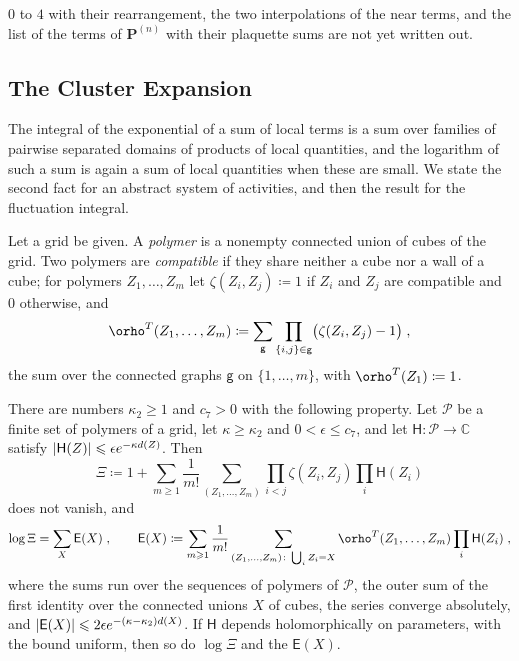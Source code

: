 \documentclass[11pt]{preprint}
\let\rho\orho
\DeclarePairedDelimiter{\abs}{\lvert}{\rvert}
\numberwithin{equation}{section}
\begin{document}
$0$ to $4$ with their rearrangement, the two interpolations of the near terms, and the list of the terms of $\mathbf P^{(n)}$ with their plaquette sums are not yet written out.

\subsection{The Cluster Expansion}\label{sec:cluster-expansion}

The integral of the exponential of a sum of local terms is a sum over families of pairwise separated domains of products of local quantities, and the logarithm of such a sum is again a sum of local quantities when these are small. We state the second fact for an abstract system of activities, and then the result for the fluctuation integral.

\begin{definition}[Polymers]\label{def:polymers}
Let a grid be given. A \emph{polymer} is a nonempty connected union of cubes of the grid. Two polymers are \emph{compatible} if they share neither a cube nor a wall of a cube; for polymers $Z_1, \dots, Z_m$ let $\zeta(Z_i, Z_j) \coloneqq 1$ if $Z_i$ and $Z_j$ are compatible and $0$ otherwise, and
\begin{equation}\label{eq:ursell}
    \rho^T(Z_1, \dots, Z_m) \coloneqq \sum_{\mathsf g}\prod_{\{ i, j \} \in \mathsf g}\bigl(\zeta(Z_i, Z_j) - 1\bigr)\;,
\end{equation}
the sum over the connected graphs $\mathsf g$ on $\{ 1, \dots, m \}$, with $\rho^T(Z_1) \coloneqq 1$.
\end{definition}

\begin{theorem}\label{thm:polymer-logarithm}
There are numbers $\kappa_2 \geqslant 1$ and $c_7 > 0$ with the following property. Let $\mathcal P$ be a finite set of polymers of a grid, let $\kappa \geqslant \kappa_2$ and $0 < \epsilon \leqslant c_7$, and let $\mathsf H \colon \mathcal P \to \mathbb C$ satisfy $\abs{\mathsf H(Z)} \leqslant \epsilon e^{-\kappa d(Z)}$. Then
\begin{equation}\label{eq:polymer-sum}
    \Xi \coloneqq 1 + \sum_{m \geqslant 1}\frac{1}{m!}\sum_{(Z_1, \dots, Z_m)}\prod_{i < j}\zeta(Z_i, Z_j)\prod_{i}\mathsf H(Z_i)
\end{equation}
does not vanish, and
\begin{equation}\label{eq:polymer-logarithm}
    \log\Xi = \sum_X\mathsf E(X)\;,
    \qquad
    \mathsf E(X) \coloneqq \sum_{m \geqslant 1}\frac{1}{m!}\sum_{(Z_1, \dots, Z_m)\colon \bigcup_iZ_i = X}\rho^T(Z_1, \dots, Z_m)\prod_i\mathsf H(Z_i)\;,
\end{equation}
where the sums run over the sequences of polymers of $\mathcal P$, the outer sum of the first identity over the connected unions $X$ of cubes, the series converge absolutely, and $\abs{\mathsf E(X)} \leqslant 2\epsilon e^{-(\kappa - \kappa_2)d(X)}$. If $\mathsf H$ depends holomorphically on parameters, with the bound uniform, then so do $\log\Xi$ and the $\mathsf E(X)$.
\end{theorem}
\end{document}
